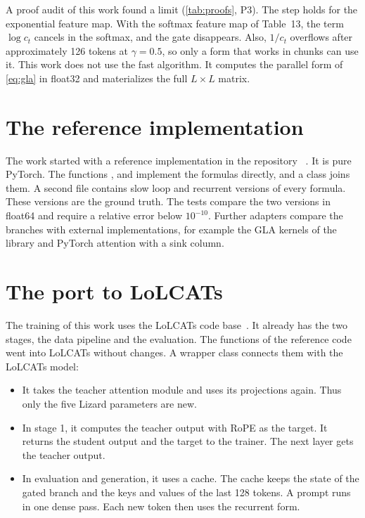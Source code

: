 A proof audit of this work found a limit (\cref{tab:proofs}, P3). The step holds for the exponential feature map. With the softmax feature map of Table~13, the term $\log c_t$ cancels in the softmax, and the gate disappears. Also, $1/c_t$ overflows after approximately 126 tokens at $\gamma = 0.5$, so only a form that works in chunks can use it. This work does not use the fast algorithm. It computes the parallel form of \cref{eq:gla} in float32 and materializes the full $L \times L$ matrix.

\section{The reference implementation}
\label{sec:reference}

The work started with a reference implementation in the repository ~\cite{jkurepo}. It is pure PyTorch. The functions ,  and  implement the formulas directly, and a class  joins them. A second file contains slow loop and recurrent versions of every formula. These versions are the ground truth. The tests compare the two versions in float64 and require a relative error below $10^{-10}$. Further adapters compare the branches with external implementations, for example the GLA kernels of the  library and PyTorch attention with a sink column.

\section{The port to LoLCATs}
\label{sec:port}

The training of this work uses the LoLCATs code base~\cite{lolcats,lolcatsrepo}. It already has the two stages, the data pipeline and the evaluation. The functions of the reference code went into LoLCATs without changes. A wrapper class connects them with the LoLCATs model:

\begin{itemize}
\item It takes the teacher attention module and uses its projections again. Thus only the five Lizard parameters are new.
\item In stage 1, it computes the teacher output with RoPE as the target. It returns the student output and the target to the trainer. The next layer gets the teacher output.
\item In evaluation and generation, it uses a cache. The cache keeps the state of the gated branch and the keys and values of the last 128 tokens. A prompt runs in one dense pass. Each new token then uses the recurrent form.
\end{itemize}

